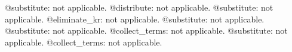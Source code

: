 \documentclass[11pt]{article}
\begin{document}
@substitute: not applicable.
@distribute: not applicable.
@substitute: not applicable.
@eliminate\_kr: not applicable.
@substitute: not applicable.
@substitute: not applicable.
@collect\_terms: not applicable.
@substitute: not applicable.
@collect\_terms: not applicable.
\end{document}
